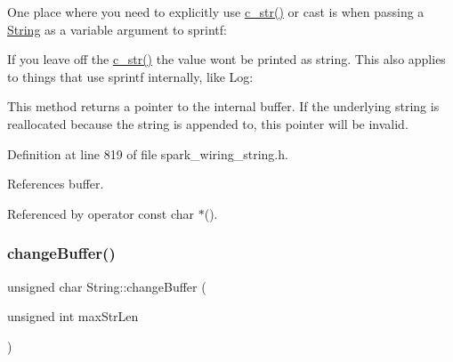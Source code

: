One place where you need to explicitly use \hyperlink{class_string_a0274f3e61533d15086816fb7f47ccb54}{c\+\_\+str()} or cast is when passing a \hyperlink{class_string}{String} as a variable argument to sprintf\+:




If you leave off the \hyperlink{class_string_a0274f3e61533d15086816fb7f47ccb54}{c\+\_\+str()} the value won\textquotesingle{}t be printed as string. This also applies to things that use sprintf internally, like Log\+:




This method returns a pointer to the internal buffer. If the underlying string is reallocated because the string is appended to, this pointer will be invalid. 

Definition at line 819 of file spark\+\_\+wiring\+\_\+string.\+h.



References buffer.



Referenced by operator const char $\ast$().

\mbox{\label{class_string_aea30ddc42b0dd5434d23606c39580e5d}} 
\subsubsection{\texorpdfstring{change\+Buffer()}{changeBuffer()}}
{\footnotesize\ttfamily unsigned char String\+::change\+Buffer (\begin{DoxyParamCaption}\item[{unsigned int}]{max\+Str\+Len }\end{DoxyParamCaption})\hspace{0.3cm}{\ttfamily [protected]}}

\mbox{\label{class_string_aee512943b0a68596e1f946fcfda757af}} 
